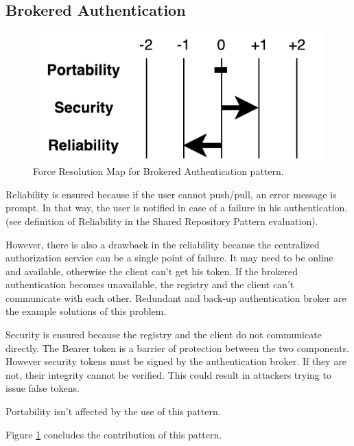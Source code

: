 \subsection{Brokered Authentication}

\begin{figure}[H]
\centering
\includegraphics[scale=0.7]{6-evaluation/images/brokered_auth_frm.pdf}
\caption{Force Resolution Map for Brokered Authentication pattern.}
\label{fig:brokered-auth-frm}
\end{figure}

Reliability is ensured because if the user cannot push/pull, an error message is
prompt. In that way, the user is notified in case of a failure in his
authentication. (see definition of Reliability in the Shared Repository Pattern
evaluation).

However, there is also a drawback in the reliability because the centralized
authorization service can be a single point of failure. It may need to be online
and available, otherwise the client can't get his token. If the brokered
authentication becomes unavailable, the registry and the client can't
communicate with each other. Redundant and back-up authentication broker are the
example solutions of this problem.

Security is ensured because the registry and the client do not communicate
directly. The Bearer token is a barrier of protection between the two
components. However security tokens must be signed by the authentication broker.
If they are not, their integrity cannot be verified. This could result in
attackers trying to issue false tokens.

Portability isn't affected by the use of this pattern.

Figure \ref{fig:brokered-auth-frm} concludes the contribution of this pattern.
